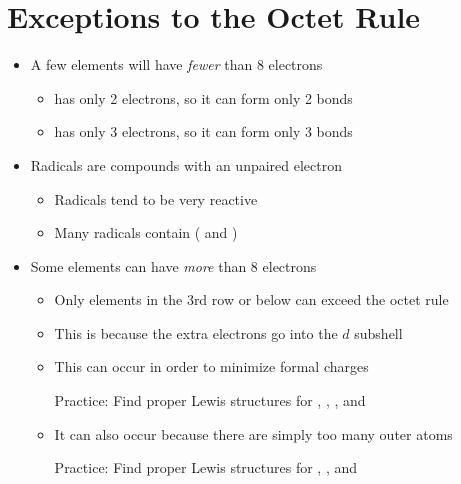 \documentclass[12pt, openany, letterpaper]{memoir}
\begin{document}
\section{Exceptions to the Octet Rule}
\begin{itemize}
	\item A few elements will have \emph{fewer} than 8 electrons
	      \begin{itemize}
		      \item {} has only 2 electrons, so it can form only 2 bonds
		      \item {} has only 3 electrons, so it can form only 3 bonds
	      \end{itemize}
	\item Radicals are compounds with an unpaired electron
	      \begin{itemize}
		      \item Radicals tend to be very reactive
		      \item Many radicals contain  ( and )
	      \end{itemize}
	\item Some elements can have \emph{more} than 8 electrons
	      \begin{itemize}
		      \item Only elements in the 3rd row or below can exceed the octet rule
		      \item This is because the extra electrons go into the $d$ subshell
		      \item This can occur in order to minimize formal charges

		            Practice: Find proper Lewis structures for , , , and 
		      \item It can also occur because there are simply too many outer atoms

		            Practice: Find proper Lewis structures for , , and 
	      \end{itemize}
\end{itemize}
\end{document}
